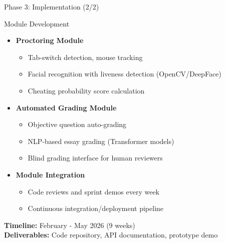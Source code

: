 \begin{frame}{Phase 3: Implementation (2/2)}
    \begin{block}{Module Development}
        \begin{itemize}
            \item \textbf{Proctoring Module}
            \begin{itemize}
                \item Tab-switch detection, mouse tracking
                \item Facial recognition with liveness detection (OpenCV/DeepFace)
                \item Cheating probability score calculation
            \end{itemize}
            
            \item \textbf{Automated Grading Module}
            \begin{itemize}
                \item Objective question auto-grading
                \item NLP-based essay grading (Transformer models)
                \item Blind grading interface for human reviewers
            \end{itemize}
            
            \item \textbf{Module Integration}
            \begin{itemize}
                \item Code reviews and sprint demos every week
                \item Continuous integration/deployment pipeline
            \end{itemize}
        \end{itemize}
    \end{block}
    
    \textbf{Timeline:} February - May 2026 (9 weeks) \\
    \textbf{Deliverables:} Code repository, API documentation, prototype demo
\end{frame}

